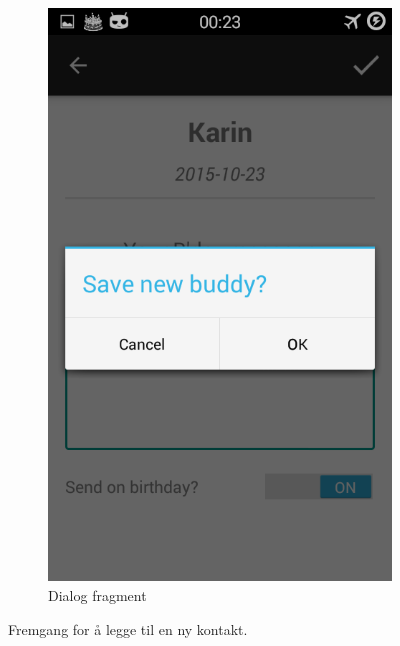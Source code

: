 \begin{figure}[ht]
\begin{subfigure}[b]{0.35\textwidth}
        \includegraphics[width=\textwidth]{./img/4.png}
        \caption{Dialog fragment}
        \label{fig:dialog_fragment}
    \end{subfigure}
    \caption{Fremgang for å legge til en ny kontakt.}
    \label{fig:ny_kontakt_workflow}
\end{figure}


